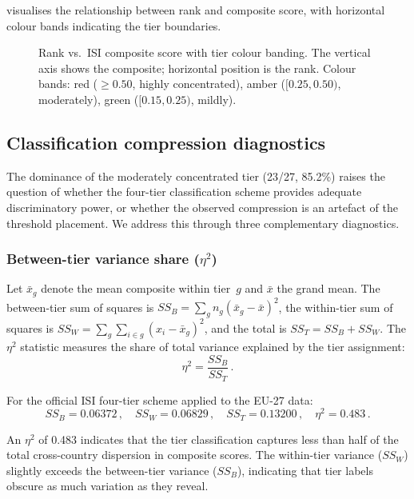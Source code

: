  visualises the relationship between rank and
composite score, with horizontal colour bands indicating the tier
boundaries.

\begin{figure}[htbp]
\centering

\caption{Rank vs.\ ISI composite score with tier colour banding.
  The vertical axis shows the composite; horizontal position is
  the rank.  Colour bands: red ($\geq 0.50$, highly concentrated),
  amber ($[0.25, 0.50)$, moderately), green ($[0.15, 0.25)$, mildly).}
\label{fig:rank-scatter}
\end{figure}

\subsection{Classification compression diagnostics}\label{sec:compression-diagnostics}

The dominance of the moderately concentrated tier (23/27, 85.2\%)
raises the question of whether the four-tier classification scheme
provides adequate discriminatory power, or whether the observed
compression is an artefact of the threshold placement.  We address
this through three complementary diagnostics.

\subsubsection{Between-tier variance share (\texorpdfstring{$\eta^2$}{η²})}

Let $\bar{x}_g$ denote the mean composite within tier~$g$ and
$\bar{x}$ the grand mean.  The between-tier sum of squares is
$SS_B = \sum_g n_g (\bar{x}_g - \bar{x})^2$, the within-tier sum of
squares is $SS_W = \sum_g \sum_{i \in g} (x_i - \bar{x}_g)^2$, and
the total is $SS_T = SS_B + SS_W$.  The $\eta^2$ statistic measures
the share of total variance explained by the tier assignment:
\begin{equation}\label{eq:eta-squared}
  \eta^2 = \frac{SS_B}{SS_T}\,.
\end{equation}

For the official ISI four-tier scheme applied to the EU-27 data:
\[
  SS_B = 0.06372\,,\quad
  SS_W = 0.06829\,,\quad
  SS_T = 0.13200\,,\quad
  \eta^2 = 0.483\,.
\]

An $\eta^2$ of 0.483 indicates that the tier classification captures
less than half of the total cross-country dispersion in composite
scores.  The within-tier variance ($SS_W$) slightly exceeds the
between-tier variance ($SS_B$), indicating that tier labels obscure
as much variation as they reveal.

